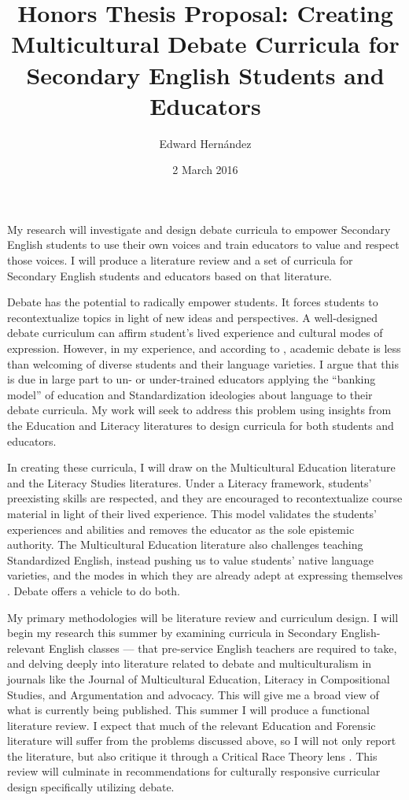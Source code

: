 \documentclass[doc,12pt,natbib]{apa6}
\begin{document}
\title{Honors Thesis Proposal: Creating Multicultural Debate Curricula for Secondary English Students and Educators}
\author{Edward Hern\'{a}ndez}
\date{2 March 2016}

My research will investigate and design debate curricula to empower Secondary
English students to use their own voices and train educators to value and
respect those voices. I will produce a literature review and a set of curricula
for Secondary English students and educators based on that literature.

Debate has the potential to radically empower students. It forces students to
recontextualize topics in light of new ideas and perspectives. A well-designed
debate curriculum can affirm student's lived experience and cultural modes of
expression. However, in my experience, and according to \citet{Polson12},
academic debate is less than welcoming of diverse students and their language
varieties. I argue that this is due in large part to un- or under-trained
educators applying the ``banking model'' of education \citep{Friere68} and
Standardization ideologies about language \citep{LippiGreen11} to their debate
curricula. My work will seek to address this problem using insights from the
Education and Literacy literatures to design curricula for both students and
educators.

In creating these curricula, I will draw on the Multicultural Education
\citep{Banks93,Banks15} literature and the Literacy Studies
\citep{Street05,Street08} literatures. Under a Literacy framework, students'
preexisting skills are respected, and they are encouraged to recontextualize
course material in light of their lived experience. This model validates the
students' experiences and abilities and removes the educator as the sole
epistemic authority. The Multicultural Education literature also challenges
teaching Standardized English, instead pushing us to value students' native
language varieties, and the modes in which they are already adept at expressing
themselves \citep{NCTE}. Debate offers a vehicle to do both.

My primary methodologies will be literature review and curriculum design. I
will begin my research this summer by examining curricula in Secondary
English-relevant English classes --- that pre-service English teachers are
required to take, and delving deeply into literature related to debate and
multiculturalism in journals like the Journal of Multicultural Education,
Literacy in Compositional Studies, and Argumentation and advocacy.  This will
give me a broad view of what is currently being published. This summer I will
produce a functional literature review. I expect that much of the relevant
Education and Forensic literature will suffer from the problems discussed
above, so I will not only report the literature, but also critique it through a
Critical Race Theory lens \citep{Harris12,LadsonBillings03}. This review will
culminate in recommendations for culturally responsive curricular design
specifically utilizing debate.
\end{document}
